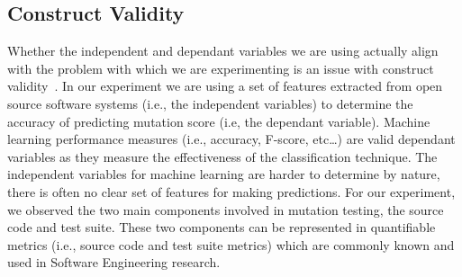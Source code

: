 \subsection{Construct Validity}
\label{subsec:experiment_construct_validity}
Whether the independent and dependant variables we are using actually align with the problem with which we are experimenting is an issue with construct validity~\cite{WRH+00,WKP10}. In our experiment we are using a set of features extracted from open source software systems (i.e., the independent variables) to determine the accuracy of predicting mutation score (i.e, the dependant variable). Machine learning performance measures (i.e., accuracy, F-score, etc\ldots) are valid dependant variables as they measure the effectiveness of the classification technique. The independent variables for machine learning are harder to determine by nature, there is often no clear set of features for making predictions. For our experiment, we observed the two main components involved in mutation testing, the source code and test suite. These two components can be represented in quantifiable metrics (i.e., source code and test suite metrics) which are commonly known and used in Software Engineering research.


